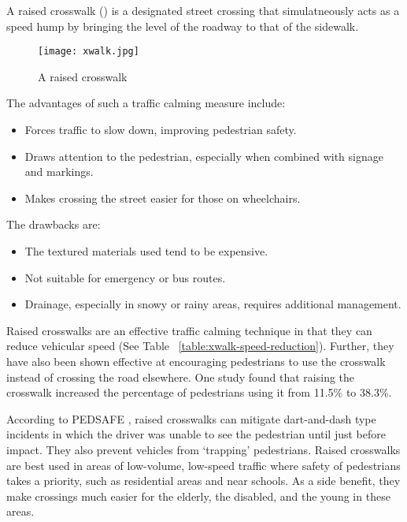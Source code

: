 A raised crosswalk () is a designated street crossing that simulatneously acts as a speed hump by bringing the level of the roadway to that of the sidewalk.

\begin{figure}[h]
	\centering
	\texttt{[image: xwalk.jpg]}
	\caption[A raised crosswalk]{A raised crosswalk\cite{kimley-xwalk}}\label{fig:xwalk}
\end{figure}

The advantages of such a traffic calming measure include:\begin{itemize}
	\item Forces traffic to slow down, improving pedestrian safety.
	\item Draws attention to the pedestrian, especially when combined with signage and markings.
	\item Makes crossing the street easier for those on wheelchairs.
\end{itemize}

The drawbacks are:\begin{itemize}
	\item The textured materials used tend to be expensive.
	\item Not suitable for emergency or bus routes.
	\item Drainage, especially in snowy or rainy areas, requires additional management.
\end{itemize}


Raised crosswalks are an effective traffic calming technique in that they can reduce vehicular speed (See Table ~\ref{table:xwalk-speed-reduction}). Further, they have also been shown effective at encouraging pedestrians to use the crosswalk instead of crossing the road elsewhere. One study \cite{pedsafe-xwalks} found that raising the crosswalk increased the percentage of pedestrians using it from 11.5\% to 38.3\%. 



According to PEDSAFE \cite{pedsafe-xwalks}, raised crosswalks can mitigate dart-and-dash type incidents in which the driver was unable to see the pedestrian until just before impact. They also prevent vehicles from `trapping' pedestrians. Raised crosswalks are best used in areas of low-volume, low-speed traffic where safety of pedestrians takes a priority, such as residential areas and near schools. As a side benefit, they make crossings much easier for the elderly, the disabled, and the young in these areas.

